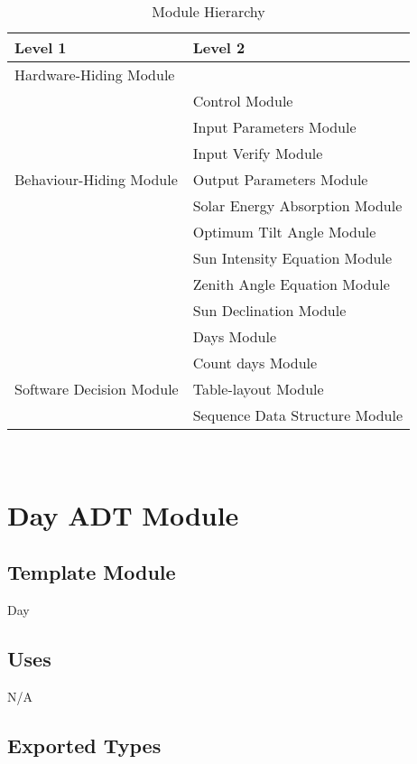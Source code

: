 \documentclass[12pt, titlepage]{article}
\begin{document}
\begin{table}[h!]
\centering
\begin{tabular}{p{} p{}}
\toprule
\textbf{Level 1} & \textbf{Level 2}\\
\midrule

{Hardware-Hiding Module} & ~ \\
\midrule

\multirow{7}{0.3\textwidth}{Behaviour-Hiding
 Module}& Control Module\\
& Input Parameters Module\\
& Input Verify Module\\
& Output Parameters Module\\
& Solar Energy Absorption Module\\
& Optimum Tilt Angle Module\\
& Sun Intensity Equation Module\\
& Zenith Angle Equation Module\\
& Sun Declination Module\\
& Days Module\\
\midrule

\multirow{3}{0.3\textwidth}{Software Decision Module} 
& Count days Module\\
& Table-layout Module\\
& Sequence Data Structure Module\\
\bottomrule

\end{tabular}
\caption{Module Hierarchy}
\label{TblMH}
\end{table}

\newpage
~\newpage

\section{Day ADT Module} \label{ModuleADTD} 

\subsection{Template Module}
Day

\subsection{Uses}

N/A\\

\subsection{Exported Types}
\end{document}
